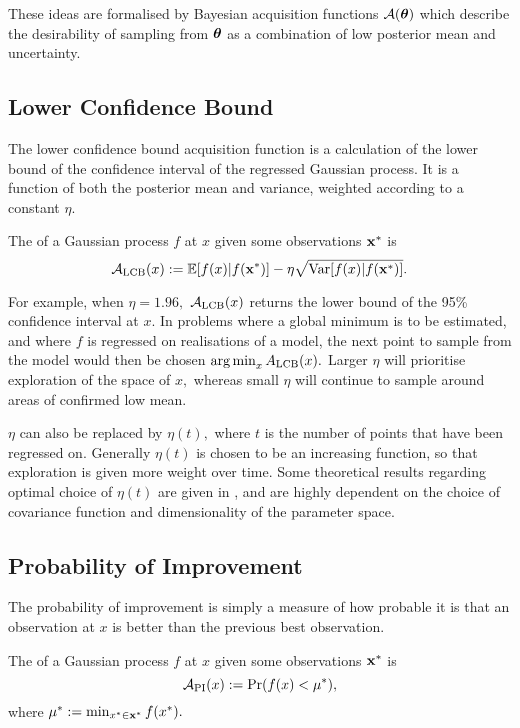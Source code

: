 These ideas are
formalised by Bayesian acquisition functions $\mathcal{A}(\bm{\theta})$ which
describe the desirability of sampling from $\bm{\theta}$ as a combination of low
posterior mean and uncertainty.

\subsection*{Lower Confidence Bound}

The lower confidence bound acquisition function is a calculation of the lower
bound of the confidence interval of the regressed Gaussian process. It is a
function of both the posterior mean and variance, weighted according to a
constant $\eta.$

\begin{definition}
    The  of a Gaussian process $f$ at $x$ given
    some observations $\mathbf{x}^\ast$ is
    $$
        \mathcal{A}_\mathrm{LCB}(x)
        := \operatorname{\mathbb{E}}[f(x) | f(\mathbf{x}^\ast)]
        - \eta \sqrt{\mathrm{Var}[f(x) | f(\mathbf{x}^\ast)]}.
    $$
\end{definition}

For example, when $\eta = 1.96,$ $\mathcal{A}_\text{LCB}(x)$ returns the lower
bound of the 95\% confidence interval at $x.$ In problems where a global
minimum is to be estimated, and where $f$ is regressed on realisations of
a model, the next point to sample from the
model would then be chosen $\operatorname*{arg\,min}_{x} A_\mathrm{LCB}(x).$
Larger $\eta$ will prioritise
exploration of the space of $x,$ whereas small $\eta$ will continue to sample
around areas of confirmed low mean.

$\eta$ can also be replaced by
$\eta(t),$ where $t$ is the number of points that have been regressed on.
Generally $\eta(t)$ is chosen to be an increasing function, so that exploration
is given more weight over time. Some theoretical results regarding optimal
choice of
$\eta(t)$ are given in \cite{srinivas_gaussian_2010}, and are highly dependent
on the choice of covariance function and dimensionality of the parameter space.

\subsection*{Probability of Improvement}

The probability of improvement is simply a measure of how probable it is that
an observation at $x$ is better than the previous best observation.

\begin{definition}
    The  of a Gaussian process $f$ at $x$ given
    some observations $\mathbf{x}^\ast$ is
    $$
        \mathcal{A}_\mathrm{PI}(x) := \Pr(f(x) < \mu^\ast),
    $$
    where $\mu^\ast := \min_{x^\ast\in\mathbf{x}^\ast}f(x^\ast).$
\end{definition}

